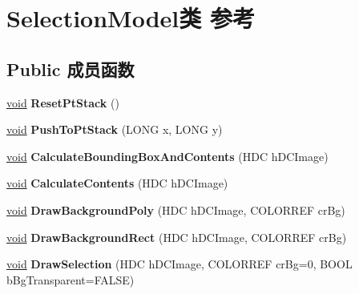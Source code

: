 \hypertarget{class_selection_model}{}\section{Selection\+Model类 参考}
\label{class_selection_model}
\subsection*{Public 成员函数}
\begin{DoxyCompactItemize}
\item 
\mbox{\label{class_selection_model_a791213309d2d218b911070c5b289195f}} 
\hyperlink{interfacevoid}{void} {\bfseries Reset\+Pt\+Stack} ()
\item 
\mbox{\label{class_selection_model_a213eb21aa85052764aed7d3aedde6545}} 
\hyperlink{interfacevoid}{void} {\bfseries Push\+To\+Pt\+Stack} (L\+O\+NG x, L\+O\+NG y)
\item 
\mbox{\label{class_selection_model_a2ede292681eb8f7d11a63b9501529340}} 
\hyperlink{interfacevoid}{void} {\bfseries Calculate\+Bounding\+Box\+And\+Contents} (H\+DC h\+D\+C\+Image)
\item 
\mbox{\label{class_selection_model_a996233c3999829ed13fed9e7efa942b2}} 
\hyperlink{interfacevoid}{void} {\bfseries Calculate\+Contents} (H\+DC h\+D\+C\+Image)
\item 
\mbox{\label{class_selection_model_a0e67869efb7f551dc0b06a010ed6001f}} 
\hyperlink{interfacevoid}{void} {\bfseries Draw\+Background\+Poly} (H\+DC h\+D\+C\+Image, C\+O\+L\+O\+R\+R\+EF cr\+Bg)
\item 
\mbox{\label{class_selection_model_afc3f3da8bbeb7a194444030386ed24a1}} 
\hyperlink{interfacevoid}{void} {\bfseries Draw\+Background\+Rect} (H\+DC h\+D\+C\+Image, C\+O\+L\+O\+R\+R\+EF cr\+Bg)
\item 
\mbox{\label{class_selection_model_af20fd721d2a0c92f60a1269ffe81181e}} 
\hyperlink{interfacevoid}{void} {\bfseries Draw\+Selection} (H\+DC h\+D\+C\+Image, C\+O\+L\+O\+R\+R\+EF cr\+Bg=0, B\+O\+OL b\+Bg\+Transparent=F\+A\+L\+SE)

\end{DoxyCompactItemize}
